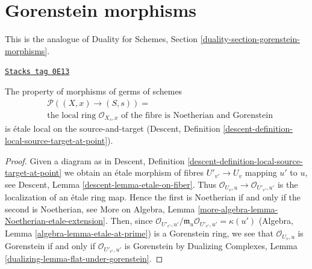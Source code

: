 \section{Gorenstein morphisms}
\label{spaces-more-morphisms-section-gorenstein}
This is the analogue of Duality for Schemes, Section
\ref{duality-section-gorenstein-morphisms}.

\begin{lemma}
\label{spaces-more-morphisms-lemma-gorenstein-local-ring-fibre}
\href{https://stacks.math.columbia.edu/tag/0E13}{\texttt{Stacks tag 0E13}}

The property of morphisms of germs of schemes
\begin{align*}
& \mathcal{P}((X, x) \to (S, s)) = \\
& \text{the local ring }
\mathcal{O}_{X_s, x}
\text{ of the fibre is Noetherian and Gorenstein}
\end{align*}
is \'etale local on the source-and-target (Descent, Definition
\ref{descent-definition-local-source-target-at-point}).
\end{lemma}

\begin{proof}
Given a diagram as in
Descent, Definition \ref{descent-definition-local-source-target-at-point}
we obtain an \'etale morphism of fibres
$U'_{v'} \to U_v$ mapping $u'$ to $u$, see
Descent, Lemma \ref{descent-lemma-etale-on-fiber}.
Thus $\mathcal{O}_{U_v, u} \to \mathcal{O}_{U'_{v'}, u'}$
is the localization of an \'etale ring map. Hence
the first is Noetherian if and only if the second is Noetherian, see
More on Algebra, Lemma \ref{more-algebra-lemma-Noetherian-etale-extension}.
Then, since $\mathcal{O}_{U'_{v'}, u'}/\mathfrak m_u \mathcal{O}_{U'_{v'}, u'}
= \kappa(u')$ (Algebra, Lemma \ref{algebra-lemma-etale-at-prime})
is a Gorenstein ring, we see that
$\mathcal{O}_{U_v, u}$ is Gorenstein if and only if
$\mathcal{O}_{U'_{v'}, u'}$ is Gorenstein by
Dualizing Complexes, Lemma \ref{dualizing-lemma-flat-under-gorenstein}.
\end{proof}

